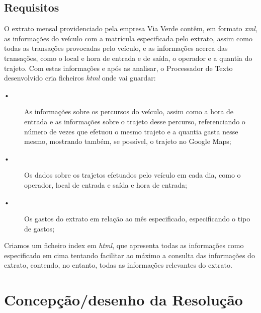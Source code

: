 \documentclass{report}
\begin{document}
\section{Requisitos}
	O extrato mensal providenciado pela empresa Via Verde contêm, em formato \textit{xml}, as informações do veículo com a matrícula especificada pelo extrato, assim como todas as transações provocadas pelo veículo, e as informações acerca das transações, como o local e hora de entrada e de saída, o operador e a quantia do trajeto. Com estas informações e após as analisar, o Processador de Texto desenvolvido cria ficheiros \textit{html} onde vai guardar:\\
\begin{description}
	\item[•] As informações sobre os percursos do veículo, assim como a hora de entrada e as informações sobre o trajeto desse percurso, referenciando o número de vezes que efetuou o mesmo trajeto e a quantia gasta nesse mesmo, mostrando também, se possível, o trajeto no Google Maps;\\
	\item[•] Os dados sobre os trajetos efetuados pelo veículo em cada dia, como o operador, local de entrada e saída e hora de entrada;\\
	\item[•] Os gastos do extrato em relação ao mês especificado, especificando o tipo de gastos;\\
\end{description}
	Criamos um ficheiro index em \textit{html}, que apresenta todas as informações como especificado em cima tentando facilitar ao máximo a consulta das informações do extrato, contendo, no entanto, todas as informações relevantes do extrato.\\





\chapter{Concepção/desenho da Resolução}
\end{document}
